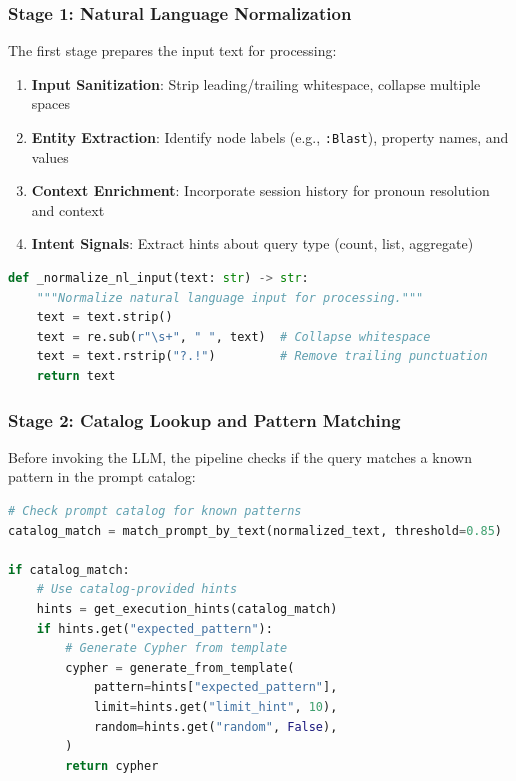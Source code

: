\subsubsection{Stage 1: Natural Language Normalization}

The first stage prepares the input text for processing:

\begin{enumerate}
    \item \textbf{Input Sanitization}: Strip leading/trailing whitespace, collapse multiple spaces
    \item \textbf{Entity Extraction}: Identify node labels (e.g., \texttt{:Blast}), property names, and values
    \item \textbf{Context Enrichment}: Incorporate session history for pronoun resolution and context
    \item \textbf{Intent Signals}: Extract hints about query type (count, list, aggregate)
\end{enumerate}

\begin{lstlisting}[language=Python, caption={Input normalization}, label=lst:normalize-input]
def _normalize_nl_input(text: str) -> str:
    """Normalize natural language input for processing."""
    text = text.strip()
    text = re.sub(r"\s+", " ", text)  # Collapse whitespace
    text = text.rstrip("?.!")         # Remove trailing punctuation
    return text
\end{lstlisting}

\subsubsection{Stage 2: Catalog Lookup and Pattern Matching}

Before invoking the LLM, the pipeline checks if the query matches a known pattern in the prompt catalog:

\begin{lstlisting}[language=Python, caption={Catalog-based query generation}, label=lst:catalog-lookup]
# Check prompt catalog for known patterns
catalog_match = match_prompt_by_text(normalized_text, threshold=0.85)

if catalog_match:
    # Use catalog-provided hints
    hints = get_execution_hints(catalog_match)
    if hints.get("expected_pattern"):
        # Generate Cypher from template
        cypher = generate_from_template(
            pattern=hints["expected_pattern"],
            limit=hints.get("limit_hint", 10),
            random=hints.get("random", False),
        )
        return cypher
\end{lstlisting}

